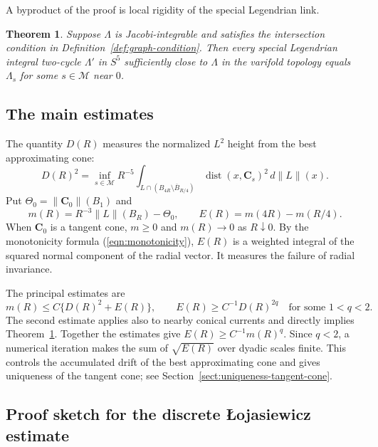 \documentclass[11pt,a4paper]{article}
\numberwithin{equation}{section}
\newtheorem{theorem}{Theorem}[section]
\theoremstyle{definition}
\theoremstyle{remark}
\newcommand{\dist}{\operatorname{dist}}
\newcommand{\dd}{\,d}
\begin{document}
	\begin{samepage}
		A byproduct of the proof is local rigidity of the special Legendrian link.
		\begin{theorem}\label{thm:rigidity}
			Suppose $\Lambda$ is Jacobi-integrable and satisfies the intersection
			condition in Definition~\ref{def:graph-condition}. Then every
			special Legendrian integral two-cycle $\Lambda'$ in $S^5$
			sufficiently close to $\Lambda$ in the varifold topology equals
			$\Lambda_s$ for some $s\in\mathcal M$ near $0$.
		\end{theorem}
	\end{samepage}
	
	\subsection{The main estimates}
	
	The quantity $D(R)$ measures the normalized $L^2$ height from the best
	approximating cone:
	\begin{equation}\label{eqn:optimized-height}
		D(R)^2=\inf_{s\in\mathcal M} R^{-5}\int_{L\cap(B_{4R}\setminus\overline B_{R/4})}
		\dist(x,\mathbf C_s)^2\dd\|L\|(x).
	\end{equation}
	Put
	$\Theta_0=\|\mathbf C_0\|(B_1)$ and
	\begin{equation}\label{eqn:radial-excess}
		m(R)=R^{-3}\|L\|(B_R)-\Theta_0,
		\qquad E(R)=m(4R)-m(R/4).
	\end{equation}
	When $\mathbf C_0$ is a tangent cone, $m\ge0$ and $m(R)\to0$ as $R\downarrow0$.
	By the monotonicity formula (\ref{eqn:monotonicity}), $E(R)$ is a weighted
	integral of the squared normal component of the radial vector. It
	measures the failure of radial invariance.
	
	The principal estimates are
	\begin{equation}\label{eqn:two-main-estimates}
		m(R)\le C\{D(R)^2+E(R)\},\qquad
		E(R)\ge C^{-1}D(R)^{2q}\quad\text{for some }1<q<2.
	\end{equation}
	The second estimate applies also to nearby conical currents and directly
	implies Theorem~\ref{thm:rigidity}. Together the estimates give
	$E(R)\ge C^{-1}m(R)^q$. Since $q<2$, a numerical iteration makes the sum of
	$\sqrt{E(R)}$ over dyadic scales finite. This controls
	the accumulated drift of the best approximating cone and gives uniqueness
	of the tangent cone; see Section~\ref{sect:uniqueness-tangent-cone}.
	
	\subsection{Proof sketch for the discrete \L{}ojasiewicz estimate}
	\label{sect:two-plane-proof-sketch}
	
\end{document}
